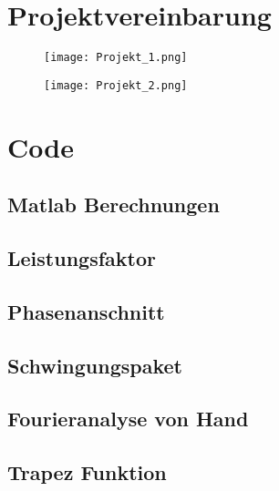 \begin{appendix} %
\section{Projektvereinbarung}	
\begin{figure}[ht!]
	\centering
	\texttt{[image: Projekt\_1.png]}	
\end{figure}
\newpage
\begin{figure}[ht!]
	\centering
	\texttt{[image: Projekt\_2.png]}	
\end{figure}
\newpage
\section{Code}
\subsection{Matlab Berechnungen}
\subsection*{Leistungsfaktor}\label{sec:Leistungsfaktor_Berechnung}


\subsection*{Phasenanschnitt}\label{sec:Phasenanschnitt_Berechnung}


\subsection*{Schwingungspaket}\label{sec:Schwingungspaket_Berechnung}


\subsection*{Fourieranalyse von Hand}\label{sec:Fourieranalyse_Berechnung}


\subsection*{Trapez Funktion}\label{sec:Trapez_Berechnung}



\end{appendix}
